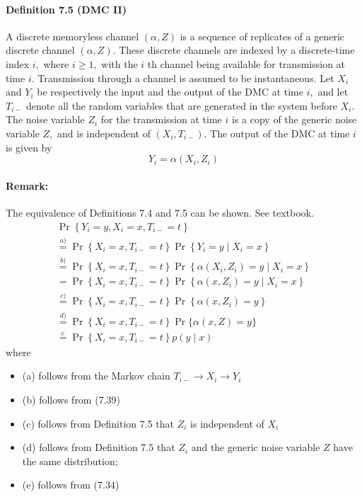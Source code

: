 \documentclass[8pt]{article}
\begin{document}
\paragraph{Definition 7.5 (DMC II)} A discrete memoryless channel $(\alpha, Z)$ is a sequence of replicates of a generic discrete channel $(\alpha, Z) .$ These discrete channels are indexed by a discrete-time index $i,$ where $i \geq 1,$ with the $i$ th channel being available for transmission at time $i$. Transmission through a channel is assumed to be instantaneous. Let $X_{i}$ and $Y_{i}$ be respectively the input and the output of the DMC at time $i,$ and let $T_{i-}$ denote all the random variables that are generated in the system before $X_{i} .$ The noise variable $Z_{i}$ for the transmission at time $i$ is a copy of the generic noise variable $Z,$ and is independent of $\left(X_{i}, T_{i-}\right)$. The output of the DMC at time $i$ is given by
$$
Y_{i}=\alpha\left(X_{i}, Z_{i}\right)
$$
\paragraph{Remark:} The equivalence of Definitions 7.4 and 7.5 can be shown. See textbook.
$$
\begin{array}{l}
\operatorname{Pr}\left\{Y_{i}=y, X_{i}=x, T_{i-}=t\right\} \\
\stackrel{a)}{=} \operatorname{Pr}\left\{X_{i}=x, T_{i-}=t\right\} \operatorname{Pr}\left\{Y_{i}=y \mid X_{i}=x\right\} \\
\stackrel{b)}{=} \operatorname{Pr}\left\{X_{i}=x, T_{i-}=t\right\} \operatorname{Pr}\left\{\alpha\left(X_{i}, Z_{i}\right)=y \mid X_{i}=x\right\} \\
=\operatorname{Pr}\left\{X_{i}=x, T_{i-}=t\right\} \operatorname{Pr}\left\{\alpha\left(x, Z_{i}\right)=y \mid X_{i}=x\right\} \\
\stackrel{c)}{=} \operatorname{Pr}\left\{X_{i}=x, T_{i-}=t\right\} \operatorname{Pr}\left\{\alpha\left(x, Z_{i}\right)=y\right\} \\
\stackrel{d)}{=} \operatorname{Pr}\left\{X_{i}=x, T_{i-}=t\right\} \operatorname{Pr}\{\alpha(x, Z)=y\} \\
\stackrel{e}{=} \operatorname{Pr}\left\{X_{i}=x, T_{i-}=t\right\} p(y \mid x)
\end{array}
$$
where
\begin{itemize}
	\item (a) follows from the Markov chain $T_{i-} \rightarrow X_{i} \rightarrow Y_{i}$
	\item (b) follows from (7.39)
	\item (c) follows from Definition 7.5 that $Z_{i}$ is independent of $X_{i}$
	\item (d) follows from Definition 7.5 that $Z_{i}$ and the generic noise variable $Z$ have the same distribution;
	\item (e) follows from (7.34)
\end{itemize}
\end{document}
